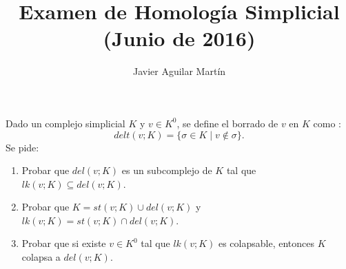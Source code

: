 \documentclass[twoside]{article}
\begin{document}
\title{Examen de Homología Simplicial (Junio de 2016)}
\author{Javier Aguilar Martín}
\maketitle

\begin{ejercicio}{1}
Dado un complejo simplicial $K$ y $v\in K^0$, se define el borrado de $v$ en $K$ como :
\[
delt(v;K)=\{\sigma\in K\mid v\notin\sigma\}.
\]
Se pide:
\begin{enumerate}
\item Probar que $del(v;K)$ es un subcomplejo de $K$ tal que $lk(v;K)\subseteq del(v;K)$.
\item Probar que $K=st(v;K)\cup del(v;K)$ y $lk(v;K)=st(v;K)\cap del(v;K)$.
\item Probar que si existe $v\in K^0$ tal que $lk(v;K)$ es colapsable, entonces $K$ colapsa a $del(v;K)$.
\end{enumerate}
\end{ejercicio}
\end{document}

